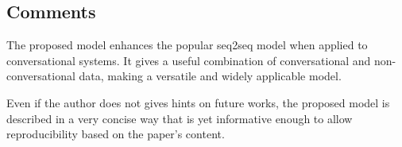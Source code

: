 \documentclass{article}
\begin{document}
\subsection*{Comments}

The proposed model enhances the popular seq2seq model when applied to
conversational systems. It gives a useful combination of conversational
and non-conversational data, making a versatile and widely applicable model.

Even if the author does not gives hints on future works, the proposed model
is described in a very concise way that is yet informative enough to allow
reproducibility based on the paper’s content.
\end{document}
